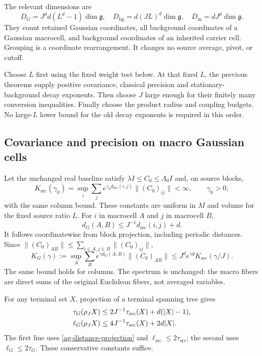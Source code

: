 The relevant dimensions are
\begin{equation}\label{ag-dimensions}
 D_G=J^d d(L^d-1)\dim\mathfrak g,
 \quad D_{\mathrm{bg}}=d(JL)^d\dim\mathfrak g,
 \quad D_{\mathrm{in}}=dJ^d\dim\mathfrak g.
\end{equation}
They count retained Gaussian coordinates, all background
coordinates of a Gaussian macrocell, and background coordinates
of an inherited carrier cell. Grouping is a coordinate
rearrangement. It changes no source average, pivot, or cutoff.

Choose $L$ first using the fixed weight test below. At that
fixed $L$, the previous theorems supply positive covariance,
classical precision and stationary-background decay exponents.
Then choose $J$ large enough for their finitely many conversion
inequalities. Finally choose the product radius and coupling
budgets. No large-$L$ lower bound for the old decay exponents
is required in this order.

\subsection{Covariance and precision on macro Gaussian cells}

Let the unchanged real baseline satisfy
$\lambda I\le C_0\le\Lambda_0I$ and, on source blocks,
\begin{equation}\label{ag-source-covariance}
 K_{\mathrm{src}}(\gamma_0)
 =\sup_i\sum_j e^{\gamma_0d_{\mathrm{src}}(i,j)}
                   \|(C_0)_{ij}\|<\infty,
 \qquad \gamma_0>0,
\end{equation}
with the same column bound. These constants are uniform in
$M$ and volume for the fixed source ratio $L$.
For $i$ in macrocell $A$ and $j$ in macrocell $B$,
\begin{equation}\label{ag-distance-projection}
 d_G(A,B)\le J^{-1}d_{\mathrm{src}}(i,j)+d.
\end{equation}
It follows coordinatewise from block projection, including
periodic distances. Since
$\|(C_0)_{AB}\|\le\sum_{i\in A,j\in B}\|(C_0)_{ij}\|$,
\begin{equation}\label{ag-covariance-bound}
 K_G(\gamma):=\sup_A\sum_B e^{\gamma d_G(A,B)}\|(C_0)_{AB}\|
 \le J^d e^{\gamma d}K_{\mathrm{src}}(\gamma/J).
\end{equation}
The same bound holds for columns. The spectrum is unchanged:
the macro fibers are direct sums of the original Euclidean
fibers, not averaged variables.

For any terminal set $X$, projection of a terminal spanning
tree gives
\begin{align}
 \tau_G(\rho_JX)
 &\le 2J^{-1}\tau_{\mathrm{src}}(X)+d(|X|-1),\notag\\
 \ell_G(\rho_JX)
 &\le 4J^{-1}\tau_{\mathrm{src}}(X)+2d|X|.             \label{ag-support-projection}
\end{align}
The first line uses \eqref{ag-distance-projection} and
$\ell_{\mathrm{src}}\le2\tau_{\mathrm{src}}$; the second
uses $\ell_G\le2\tau_G$. These conservative constants suffice.

